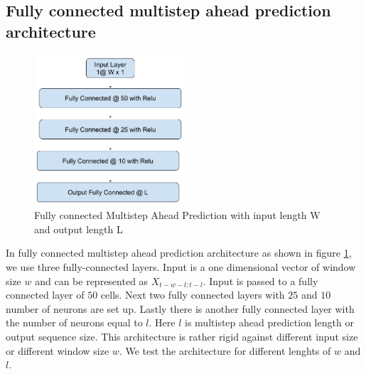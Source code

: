 \documentclass[12pt]{article}
\begin{document}
\subsection{Fully connected multistep ahead prediction architecture}
\begin{figure}[H]
\centering	
        \includegraphics[width=0.5\textwidth]{images/architecture/NnMultistepAheadPrediction.png}
    \caption{Fully connected Multistep Ahead Prediction with input length W and output length L}
    \label{NnMultiStep}
\end{figure}
In fully connected multistep ahead prediction architecture as shown in figure \ref{NnMultiStep}, we use three fully-connected layers. Input is a one dimensional vector of window size $w$ and can be represented as $X_{t-w-l:t-l}$. Input is passed to a fully connected layer of $50$ cells. Next two fully connected layers with $25$ and $10$ number of neurons are set up. Lastly there is another fully connected layer with the number of neurons equal to $l$. Here $l$ is multistep ahead prediction length or output sequence size. This architecture is rather rigid against different input size or different window size $w$. We test the architecture for different lenghts of $w$ and $l$.
\end{document}
